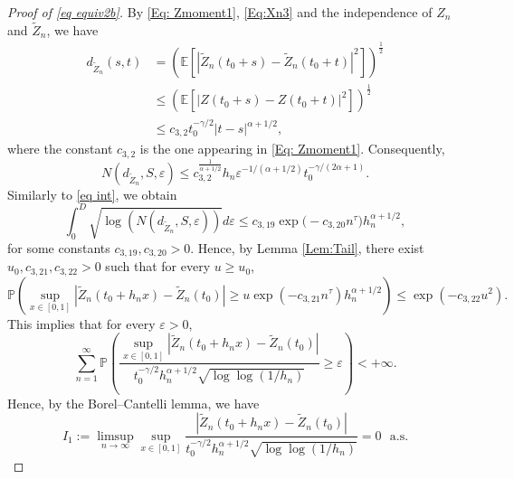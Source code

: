 \documentclass[11pt, reqno]{amsart}
\numberwithin{equation}{section}
\newcommand{\1}{{\bf 1}}
\newcommand{\2}{{\bf 2}}
\begin{document}
\begin{proof}[Proof of \eqref{eq equiv2b}]
 {
By \eqref{Eq: Zmoment1}, \eqref{Eq:Xn3} and the independence of  $Z_n$ and $\widetilde{Z}_n$,    we have
  }
 \begin{align*} 
 {d_{\widetilde{Z}_n}(s,t)} & {= \left(\mathbb E\left[|\widetilde{Z}_n(t_0+s)-\widetilde{Z}_n(t_0+t)|^2\right]\right)^{\frac12}   } \\
& {\le \left(\mathbb E\left[| Z(t_0+s)- Z(t_0+t)|^2\right]\right)^{\frac12}} \\
& {\le c_{3, 2} t_0^{-\gamma/2}|t-s|^{\alpha+1/2},}
\end{align*}
 {where the constant  $c_{3,2}$ is the one appearing  in  \eqref{Eq: Zmoment1}.   Consequently, 
  $$
N(d_{\widetilde{Z}_n}, S, \varepsilon)\le  {c_{3,2}^{\frac{1}{\alpha+1/2}}} h_n \varepsilon^{-1/(\alpha+1/2)}t_0^{-\gamma/(2\alpha+1)}.
$$
}  Similarly to \eqref{eq int}, we obtain
$$
\int_0^D\sqrt{\log( N(d_{\widetilde{Z}_n}, S, \varepsilon))}d\varepsilon\le c_{3,19} \exp\big(-c_{3,20}  n^{\tau}\big)h_n^{\alpha+1/2},
$$
for some constants $c_{3,19}, c_{3,20}>0$. Hence, by Lemma \ref{Lem:Tail}, there  exist  $u_0, c_{3,21}, c_{3,22}>0$ such that for every $u\ge u_0$,
\begin{equation*}%
\mathbb P\left(\sup_{x\in [0,1]}\left|\widetilde{Z}_n(t_0+h_nx)-\widetilde{Z}_n(t_0)\right|
\ge u\exp\left(-c_{3,21} n^{\tau}\right)h_n^{\alpha+1/2}\right)
\le  \exp\left(-c_{3,22} u^2\right).
\end{equation*}
This implies that for every $\varepsilon>0$,
\begin{equation}\label{eq: sum1}
\sum_{n=1}^{\infty} \mathbb P\left(\frac{\sup_{x\in [0,1]}\left|\widetilde{Z}_n(t_0+h_nx)-\widetilde{Z}_n(t_0)\right|   }
{ t_0^{-\gamma/2}h_n^{\alpha+1/2}\sqrt{\log\log( 1/h_n)}} \ge \varepsilon\right)<+\infty.
\end{equation}
Hence, by the Borel--Cantelli lemma, we have
\begin{equation}\label{eq: lim1}
I_1:=\limsup_{n\rightarrow\infty}\sup_{x\in [0,1]}\frac{ \left|\widetilde{Z}_n(t_0+h_nx)-\widetilde{Z}_n(t_0)\right|   }
{ t_0^{-\gamma/2}h_n^{\alpha+1/2}\sqrt{\log\log( 1/h_n)}}=0 \ \ \ \text{a.s.}
\end{equation}



\end{proof}
\end{document}
